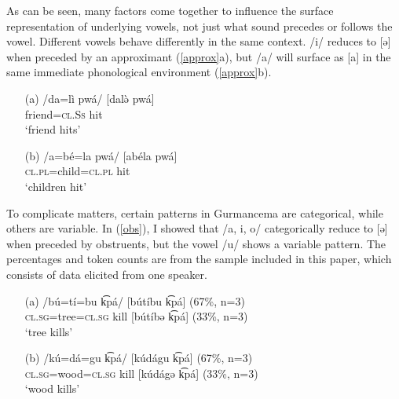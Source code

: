\documentclass[output=paper,newtxmath,modfonts,nonflat,draftmode]{langsci/langscibook}
\begin{document}
As can be seen, many factors come together to influence the surface representation of underlying vowels, not just what sound precedes or follows the vowel. Different vowels behave differently in the same context. /i/ reduces to [ə] when preceded by an approximant (\ref{approx}a), but /a/ will surface as [a] in the same immediate phonological environment (\ref{approx}b). 

\ea \label{approx}
\begin{enumerate}
\item[(a)]
\gll /da=lì pwá/ \hspace{0.8cm} [dalə̀ pwá]\\
friend=\textsc{cl.Ss} hit\\
\glt `friend hits'

\item[(b)]
\gll /a=bé=la pwá/ \hspace{0.5cm} [abéla pwá]\\
\textsc{cl.pl}=child=\textsc{cl.pl} hit\\
\glt `children hit'

\end{enumerate}
\z

To complicate matters, certain patterns in Gurmancema are categorical, while others are variable. In (\ref{obs}), I showed that /a, i, o/ categorically reduce to [ə] when preceded by obstruents, but the vowel /u/ shows a variable pattern. The percentages and token counts are from the sample included in this paper, which consists of data elicited from one speaker. 

\ea \label{u}
\begin{enumerate}
\item[(a)]
\gll /bú=tí=bu k͡pá/  \hspace{0.6cm} [bútíbu k͡pá] (67\%, n=3) \\
 \textsc{cl.sg}=tree=\textsc{cl.sg} kill \hspace{0.5cm} [bútíbə k͡pá] (33\%, n=3)\\ 
\glt `tree kills'

\item[(b)]
\gll /kú=dá=gu k͡pá/  \hspace{0.5cm} [kúdágu k͡pá] (67\%, n=3) \\
 \textsc{cl.sg}=wood=\textsc{cl.sg} kill \hspace{0.5cm} [kúdágə k͡pá] (33\%, n=3)\\ 
\glt `wood kills'

\end{enumerate}
\z
\end{document}
